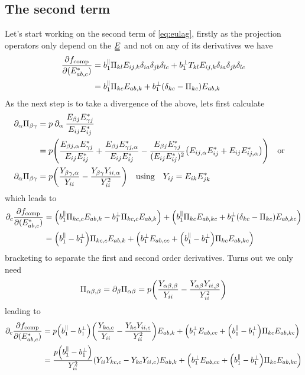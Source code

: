 \documentclass{article}
\newcommand\barbelow[1]{\stackunder[1.2pt]{$#1$}{\rule{1.5ex}{.1ex}}}
\newcommand{\du}[1]{\barbelow{\barbelow{#1}}}
\newcommand{\pp}{\partial}
\begin{document}
\subsection{The second term}
Let's start working on the second term of \cref{eq:eulag}, firstly as the projection operators only depend on the $\du{E}$ and not on any of its derivatives we have
\begin{align}
    \pdv{f_\text{comp}}{(E_{ab,c}^*)} &= b_1^\parallel \Pi_{kl} E_{ij,k}\delta_{ia}\delta_{jb}\delta_{lc} + b_1^\perp T_{kl} E_{ij,k}\delta_{ia}\delta_{jb}\delta_{lc} \\
    &= b_1^\parallel \Pi_{kc} E_{ab,k} + b_1^\perp \qty(\delta_{kc} - \Pi_{kc}) E_{ab,k}
\end{align}
As the next step is to take a divergence of the above, lets first calculate
\begin{align}
    \pp_\alpha \Pi_{\beta\gamma} &= p \mathbin{\pp_\alpha} \frac{E_{\beta j}E_{\gamma j}^*}{E_{ij}E_{ij}^*} \\
    &= p \qty(\frac{E_{\beta j, \alpha}E_{\gamma j}^*}{E_{ij}E_{ij}^*} + \frac{E_{\beta j}E_{\gamma j, \alpha}^*}{E_{ij}E_{ij}^*} - \frac{E_{\beta j}E_{\gamma j}^*}{(E_{ij}E_{ij}^*)^2}\qty(E_{ij,\alpha}E_{ij}^* + E_{ij}E_{ij,\alpha}^*) ) && \text{or} \\
    \pp_\alpha \Pi_{\beta\gamma} &= p \qty(\frac{Y_{\beta\gamma,\alpha}}{Y_{ii}} - \frac{Y_{\beta\gamma} Y_{ii,\alpha}}{Y_{ii}^2}) \qq{using} Y_{ij} = E_{ik}E_{jk}^*
\end{align}
which leads to
\begin{align}
    \pp_c \pdv{f_\text{comp}}{(E_{ab,c}^*)} &= \qty(b_1^\parallel \Pi_{kc,c} E_{ab,k} - b_1^\perp \Pi_{kc,c} E_{ab,k}) + \qty(b_1^\parallel \Pi_{kc} E_{ab,kc} + b_1^\perp \qty(\delta_{kc} - \Pi_{kc}) E_{ab,kc}) \\
    &= \qty(b_1^\parallel - b_1^\perp) \Pi_{kc,c} E_{ab,k} + \qty(b_1^\perp E_{ab,cc} + \qty(b_1^\parallel - b_1^\perp) \Pi_{kc} E_{ab,kc}) \label{eq:secondtermfirst}
\end{align}
bracketing to separate the first and second order derivatives. Turns out we only need
\begin{equation}
    \Pi_{\alpha\beta,\beta} = \pp_\beta \Pi_{\alpha\beta} = p \qty(\frac{Y_{\alpha\beta,\beta}}{Y_{ii}} - \frac{Y_{\alpha\beta} Y_{ii,\beta}}{Y_{ii}^2})
\end{equation}
leading to
\begin{align}
    \pp_c \pdv{f_\text{comp}}{(E_{ab,c}^*)} &= p\qty(b_1^\parallel - b_1^\perp) \qty(\frac{Y_{kc,c}}{Y_{ii}} - \frac{Y_{kc} Y_{ii,c}}{Y_{ii}^2}) E_{ab,k} + \qty(b_1^\perp E_{ab,cc} + \qty(b_1^\parallel - b_1^\perp) \Pi_{kc} E_{ab,kc}) \\
    &= \frac{p\qty(b_1^\parallel - b_1^\perp)}{Y_{ii}^2} \qty(Y_{ii}Y_{kc,c} - Y_{kc} Y_{ii,c}) E_{ab,k} + \qty(b_1^\perp E_{ab,cc} + \qty(b_1^\parallel - b_1^\perp) \Pi_{kc} E_{ab,kc})
\end{align}
\end{document}
